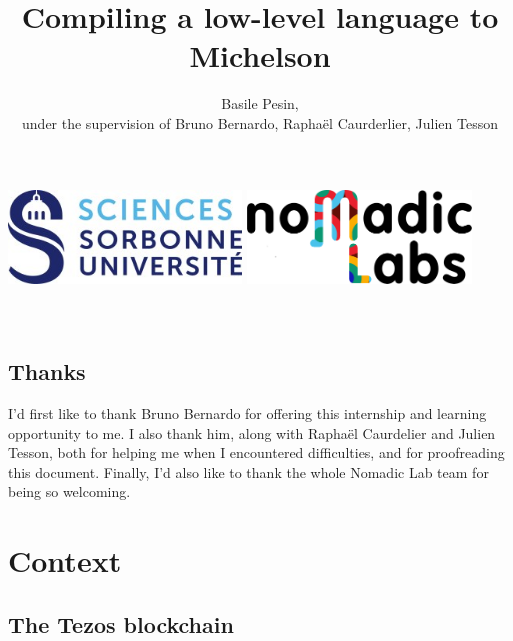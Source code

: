 \documentclass{report}
\title{Compiling a low-level language to Michelson}
\author{Basile Pesin,\\
  under the supervision of Bruno Bernardo, Raphaël Caurderlier, Julien Tesson}
\begin{document}
\makeatletter
    \begin{titlepage}
        \begin{center}
            \includegraphics[height=2.5cm]{ressources/su.jpg}
            \hspace{2cm}
            \includegraphics[height=2.5cm]{ressources/nomadic.png}\\[35ex]
            {\huge \bfseries  \@title }\\[10ex] 
            {\large \@author}\\[40ex] 
            {\large \@date}
        \end{center}
    \end{titlepage}
\makeatother

\vspace*{\fill}
\begin{center}
\section*{Thanks}
I'd first like to thank Bruno Bernardo for offering this internship and learning opportunity to me. I also thank him, along with Raphaël Caurdelier and Julien Tesson, both for helping me when I encountered difficulties, and for proofreading this document. Finally, I'd also like to thank the whole Nomadic Lab team for being so welcoming.
\noindent 
\end{center}
\vspace*{\fill}

\tableofcontents

\chapter*{Context}

\section{The Tezos blockchain}
\end{document}
